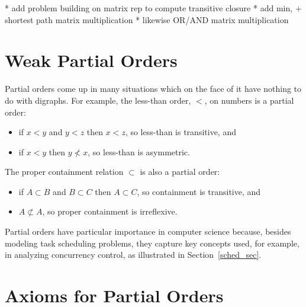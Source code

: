 \begin{problems}
\practiceproblems
{}

\classproblems
{}

\homeworkproblems
{}
\end{problems}

\begin{staffnotes}
* add problem building on matrix rep to compute transitive closure
* add min, + shortest path matrix  multiplication
* likewise OR/AND matrix multiplication
\end{staffnotes}

\section{Weak Partial Orders}\label{partial_order_sec}
Partial orders come up in many situations which on the face of it have
nothing to do with digraphs.  For example, the less-than order, $<$, on
numbers is a partial order:
\begin{itemize}
\item if $x <y$ and $y < z$ then $x < z$, so less-than is transitive, and
\item  if $x <y$ then $y \not < x$, so less-than is asymmetric.
\end{itemize}
 The proper containment relation $\subset$ is also a
partial order:
\begin{itemize}
\item if $A \subset B$ and $B \subset C$ then $A \subset C$,
so containment is transitive, and
\item  $A \not\subset A$, so proper containment is irreflexive.
\end{itemize}


\iffalse
, but so is the containment relation on sets
and the divisibility relation on integers.
\fi

Partial orders have particular importance in computer science because,
besides modeling task scheduling problems, they capture key concepts
used, for example, in analyzing concurrency control, as illustrated in
Section~\ref{sched_sec}.

\iffalse

\section{Axioms for Partial Orders}

